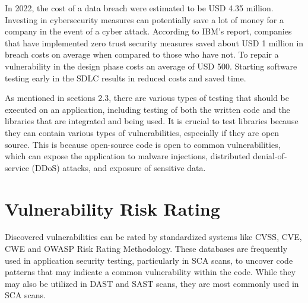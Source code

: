In 2022, the cost of a data breach were estimated to be USD 4.35 million. Investing in cybersecurity measures can potentially save a lot of money for a company in the event of a cyber attack. According to IBM's report\cite{databreach}, companies that have implemented zero trust security measures saved about USD 1 million in breach costs on average when compared to those who have not. To repair a vulnerability in the design phase costs an average of USD 500\cite{fixvulnerability}. Starting software testing early in the SDLC results in reduced costs and saved time. 

As mentioned in sections 2.3, there are various types of testing that should be executed on an application, including testing of both the written code and the libraries that are integrated and being used. It is crucial to test libraries because they can contain various types of vulnerabilities, especially if they are open source. This is because open-source code is open to common vulnerabilities, which can expose the application to malware injections, distributed denial-of-service (DDoS) attacks, and exposure of sensitive data. \cite{testlibaries}



\section{Vulnerability Risk Rating}
Discovered vulnerabilities can be rated by standardized systems like CVSS, CVE, CWE and OWASP Risk Rating Methodology. These databases are frequently used in application security testing, particularly in SCA scans, to uncover code patterns that may indicate a common vulnerability within the code. While they may also be utilized in DAST and SAST scans, they are most commonly used in SCA scans. 

